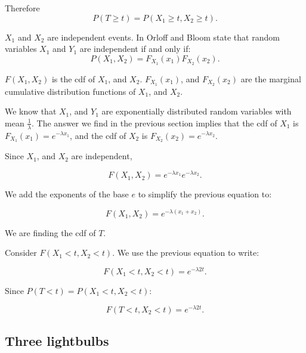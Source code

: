 \documentclass[a5paper,11pt]{article}
\begin{document}
Therefore
\begin{equation}
P\left(T \geq t \right) = 
  P \left(X_1 \geq t, X_2 \geq t \right).
\end{equation}

$X_1$ and $X_2$ are independent events.  In \cite{reading7} Orloff and Bloom
state that random variables $X_1$ and $Y_1$ are independent if and only if:
\begin{equation}
P\left(X_1, X_2 \right)=F_{X_1}\left(x_1 \right)F_{X_2}\left(x_2\right).
\end{equation}

$F \left(X_1, X_2\right)$ is the cdf of $X_1$, and $X_2$.  
$F_{X_1}\left(x_1 \right)$, and $F_{X_2}\left( x_2 \right)$ are the marginal 
cumulative distribution functions of $X_1$, and $X_2$. 

We know that $X_1$, and $Y_1$ are exponentially distributed random variables 
with mean $\frac{1}{\lambda}$.  The answer we find in the previous section 
implies that the cdf of $X_1$ is $F_{X_1}\left(x_1 \right) = e^{-\lambda x_1}$, and the cdf of $X_2$ 
is $F_{X_2}\left(x_2 \right) = e^{-\lambda x_2}$.

Since $X_1$, and $X_2$ are independent, 

\begin{equation}
F\left(X_1, X_2 \right)= e^{-\lambda x_1} e^{-\lambda x_2}.
\end{equation}

We add the exponents of the base $e$ to simplify the previous equation to:

\begin{equation}
F\left(X_1, X_2 \right)= e^{-\lambda \left(x_1 + x_2\right)}.
\end{equation}

We are finding the cdf of $T$.

Consider $F\left(X_1 < t, X_2 < t \right)$.  We use the previous equation
to write:

\begin{equation}
F\left(X_1 < t, X_2 < t \right)= e^{-\lambda 2t}.
\end{equation}

Since $P\left(T < t \right) = P\left(X_1 < t, X_2 < t \right)$:

\begin{equation}
F\left(T < t, X_2 < t \right)= e^{-\lambda 2t}.
\end{equation}

\subsection{Three lightbulbs}
\end{document}
